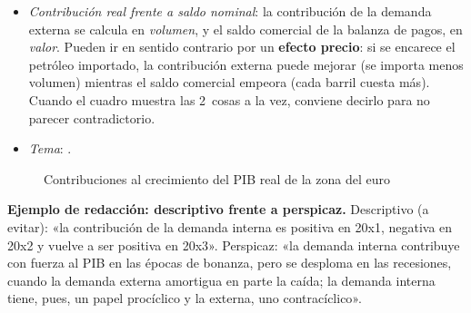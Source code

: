 \documentclass[11pt]{article}
\begin{document}
\begin{itemize}
\begin{itemize}
  \item si el sector exterior «toma el relevo» como motor en una crisis, hay que ver si suben las exportaciones o solo caen las importaciones: lo primero es una fortaleza; lo segundo, el reflejo de la caída de la renta;
  \item ante un cambio de patrón, ¿es coyuntural (un auge del precio del petróleo en un exportador) o estructural?
  \end{itemize}
\item \emph{Contribución real frente a saldo nominal}: la contribución de la demanda externa se calcula en \emph{volumen}, y el saldo comercial de la balanza de pagos, en \emph{valor}. Pueden ir en sentido contrario por un \textbf{efecto precio}: si se encarece el petróleo importado, la contribución externa puede mejorar (se importa menos volumen) mientras el saldo comercial empeora (cada barril cuesta más). Cuando el cuadro muestra las 2~cosas a la vez, conviene decirlo para no parecer contradictorio.
\item \emph{Tema}:  .
\end{itemize}

\begin{figure}[!htb]
\centering
\caption{Contribuciones al crecimiento del PIB real de la zona del euro}\label{fig:contribuciones-pib-zona-euro}
\end{figure}

\begin{anotaciones}
\textbf{Ejemplo de redacción: descriptivo frente a perspicaz.}
Descriptivo (a evitar): «la contribución de la demanda interna es positiva en 20x1, negativa en 20x2 y vuelve a ser positiva en 20x3». Perspicaz: «la demanda interna contribuye con fuerza al PIB en las épocas de bonanza, pero se desploma en las recesiones, cuando la demanda externa amortigua en parte la caída; la demanda interna tiene, pues, un papel procíclico y la externa, uno contracíclico».
\end{anotaciones}
\end{document}
